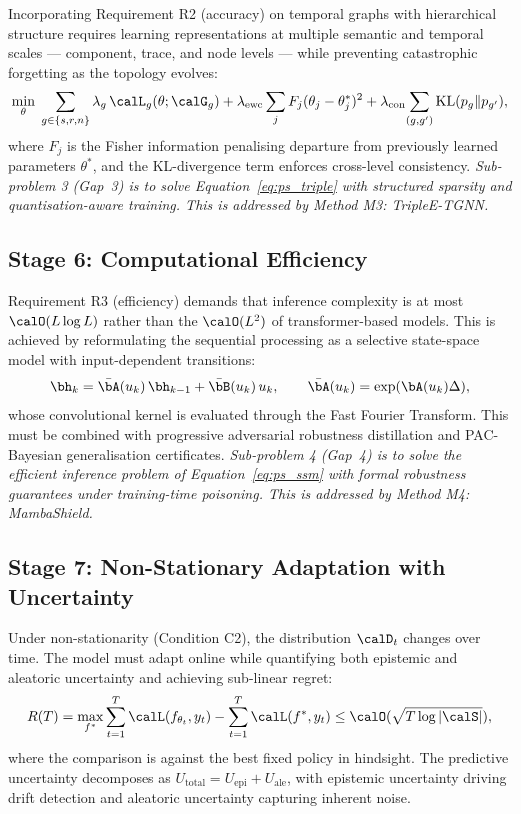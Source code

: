 Incorporating Requirement R2 (accuracy) on temporal graphs with hierarchical structure requires learning representations at multiple semantic and temporal scales --- component, trace, and node levels --- while preventing catastrophic forgetting as the topology evolves:
\begin{equation}
\min_\theta\;
\sum_{g\in\{s,r,n\}}\lambda_g\,\calL_g(\theta;\calG_g)
+ \lambda_{\mathrm{ewc}}\sum_j F_j(\theta_j-\theta_{j}^{*})^2
+ \lambda_{\mathrm{con}}\!\sum_{(g,g')}\mathrm{KL}(p_g\|p_{g'}),
\label{eq:ps_triple}
\end{equation}
where $F_j$ is the Fisher information penalising departure from previously learned parameters $\theta^*$, and the KL-divergence term enforces cross-level consistency. \emph{Sub-problem 3 (Gap~3) is to solve Equation~\eqref{eq:ps_triple} with structured sparsity and quantisation-aware training. This is addressed by Method M3: TripleE-TGNN.}


\subsection{Stage 6: Computational Efficiency}

Requirement R3 (efficiency) demands that inference complexity is at most $\calO(L\log L)$ rather than the $\calO(L^2)$ of transformer-based models. This is achieved by reformulating the sequential processing as a selective state-space model with input-dependent transitions:
\begin{equation}
\bh_{k} = \bar{\bA}(u_k)\,\bh_{k-1} + \bar{\bB}(u_k)\,u_k,
\qquad
\bar{\bA}(u_k)=\exp(\bA(u_k)\Delta),
\label{eq:ps_ssm}
\end{equation}
whose convolutional kernel is evaluated through the Fast Fourier Transform. This must be combined with progressive adversarial robustness distillation and PAC-Bayesian generalisation certificates. \emph{Sub-problem 4 (Gap~4) is to solve the efficient inference problem of Equation~\eqref{eq:ps_ssm} with formal robustness guarantees under training-time poisoning. This is addressed by Method M4: MambaShield.}


\subsection{Stage 7: Non-Stationary Adaptation with Uncertainty}

Under non-stationarity (Condition C2), the distribution $\calD_t$ changes over time. The model must adapt online while quantifying both epistemic and aleatoric uncertainty and achieving sub-linear regret:
\begin{equation}
R(T) = \max_{f^*}\sum_{t=1}^{T}\calL(f_{\theta_t},y_t) - \sum_{t=1}^{T}\calL(f^*,y_t) \le \calO(\sqrt{T\log|\calS|}),
\label{eq:ps_regret}
\end{equation}
where the comparison is against the best fixed policy in hindsight. The predictive uncertainty decomposes as $U_{\mathrm{total}} = U_{\mathrm{epi}} + U_{\mathrm{ale}}$, with epistemic uncertainty driving drift detection and aleatoric uncertainty capturing inherent noise.

